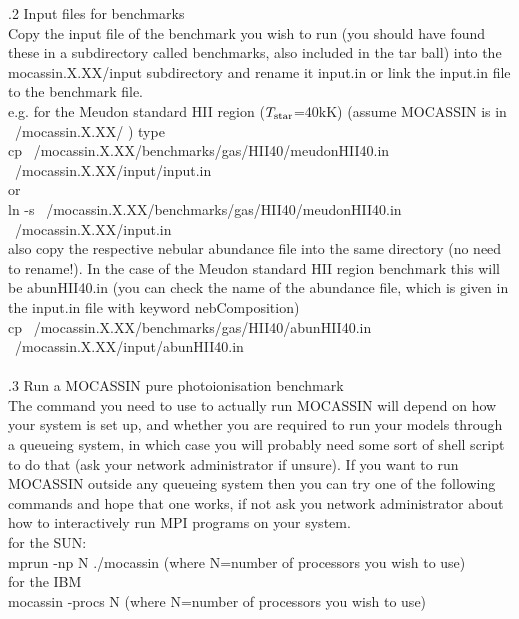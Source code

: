 \documentclass[11pt]{article}
\begin{document}
.2 Input files for benchmarks\\
        Copy the input file of the benchmark you wish to run (you should have 
        found these in a subdirectory called benchmarks, also included in the tar ball) 
        into the mocassin.X.XX/input subdirectory and rename it input.in or link the input.in 
        file to the benchmark file.\\
    
\noindent        e.g. for the Meudon standard HII region ($T_{\rm star}$=40kK) (assume MOCASSIN 
        is in ~/mocassin.X.XX/ ) type\\
\indent  cp ~/mocassin.X.XX/benchmarks/gas/HII40/meudonHII40.in ~/mocassin.X.XX/input/input.in \\
       or \\
\indent  ln -s ~/mocassin.X.XX/benchmarks/gas/HII40/meudonHII40.in ~/mocassin.X.XX/input.in\\

\noindent also copy the respective nebular abundance file into the same directory (no 
        need to rename!). In the case of the Meudon standard HII region benchmark 
        this will be abunHII40.in (you can check the name of the abundance file, 
        which is given in the input.in file with keyword nebComposition)\\
\indent  cp ~/mocassin.X.XX/benchmarks/gas/HII40/abunHII40.in ~/mocassin.X.XX/input/abunHII40.in\\
\\
.3 Run a MOCASSIN pure photoionisation benchmark\\
        The command you need to use to actually run MOCASSIN will depend on how your system is 
        set up, and whether you are required to run your models through a queueing 
        system, in which case you will probably need some sort of shell script to do 
        that (ask your network administrator if unsure).
        If you want to run MOCASSIN outside any queueing system then you can try one of 
        the following commands and hope that one works, if not ask you network 
        administrator about how to interactively run MPI programs on your system.\\

\noindent        for the SUN: \\
\indent         mprun -np N ./mocassin   (where N=number of processors you wish to use) \\

\noindent        for the IBM\\
\indent         mocassin -procs N (where N=number of processors you wish to use)\\
\end{document}
